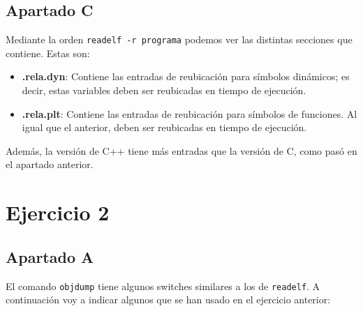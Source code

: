 \documentclass{article}
\begin{document}
\newpage

\subsection*{Apartado C}

Mediante la orden \verb|readelf -r programa| podemos ver las distintas secciones que contiene. Estas son:

\begin{itemize}
    \item \textbf{.rela.dyn}: Contiene las entradas de reubicación para símbolos dinámicos; es decir, estas variables deben ser reubicadas en tiempo de ejecución.
    \item \textbf{.rela.plt}: Contiene las entradas de reubicación para símbolos de funciones. Al igual que el anterior, deben ser reubicadas en tiempo de ejecución.
\end{itemize}

Además, la versión de C++ tiene más entradas que la versión de C, como pasó en el apartado anterior.

\bigskip

\section*{Ejercicio 2}


\subsection*{Apartado A}

El comando \verb|objdump| tiene algunos switches similares a los de \verb|readelf|. A continuación voy a indicar algunos que se han usado en el ejercicio anterior:
\end{document}
